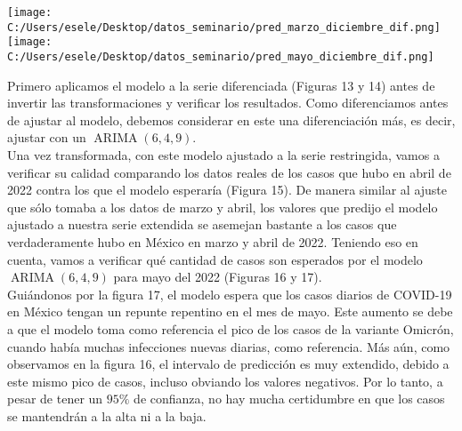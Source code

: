 \documentclass[11pt,letterpaper]{article}
\newcommand{\ARIMA}{\ensuremath{\operatorname{ARIMA}}}
\theoremstyle{definition}
\theoremstyle{theorem}
\theoremstyle{remark}
\begin{document}
		\clearpage\begin{center}
		\texttt{[image: C:/Users/esele/Desktop/datos\_seminario/pred\_marzo\_diciembre\_dif.png]}
		\texttt{[image: C:/Users/esele/Desktop/datos\_seminario/pred\_mayo\_diciembre\_dif.png]}
	\end{center}
	\par Primero aplicamos el modelo a la serie diferenciada (Figuras 13 y 14) antes de invertir las transformaciones y verificar los resultados. Como diferenciamos antes de ajustar al modelo, debemos considerar en este una diferenciación más, es decir, ajustar con un \(\ARIMA(6,4,9)\). \\
	\indent Una vez transformada, con este modelo ajustado a la serie restringida, vamos a verificar su calidad comparando los datos reales de los casos que hubo en abril de 2022 contra los que el modelo esperaría (Figura 15). De manera similar al ajuste que sólo tomaba a los datos de marzo y abril, los valores que predijo el modelo ajustado a nuestra serie extendida se asemejan bastante a los casos que verdaderamente hubo en México en marzo y abril de 2022. Teniendo eso en cuenta, vamos a verificar qué cantidad de casos son esperados por el modelo \(\ARIMA(6,4,9)\) para mayo del 2022 (Figuras 16 y 17). \\
	\indent Guiándonos por la figura 17, el modelo espera que los casos diarios de COVID-19 en México tengan un repunte repentino en el mes de mayo. Este aumento se debe a que el modelo toma como referencia el pico de los casos de la variante Omicrón, cuando había muchas infecciones nuevas diarias, como referencia. Más aún, como observamos en la figura 16, el intervalo de predicción es muy extendido, debido a este mismo pico de casos, incluso obviando los valores negativos. Por lo tanto, a pesar de tener un \(95\%\) de confianza, no hay mucha certidumbre en que los casos se mantendrán a la alta ni a la baja.
\end{document}
